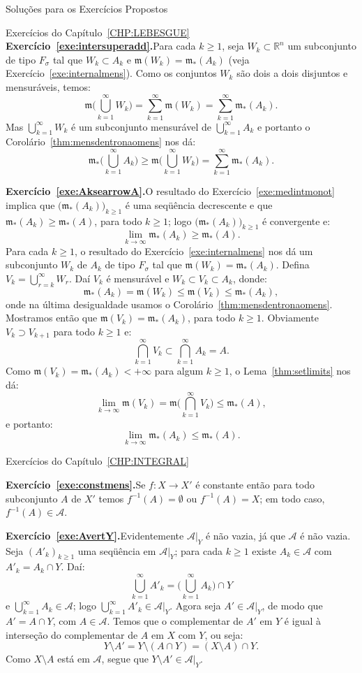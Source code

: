 \documentclass[oneside,final,11pt]{amsbook}
\newcommand{\R}{\mathds R}
\newcommand{\leb}{\mathfrak m}
\theoremstyle{remark}\newtheorem{exercise}{Exercício}[chapter]
\theoremstyle{remark}\newtheorem{*exercise}[exercise]{\hbox to 0pt{\hskip 0pt minus 1fil*}Exercício}
\theoremstyle{definition}\newtheorem{exdefin}{Definição}[chapter]
\theoremstyle{plain}\newtheorem{teo}{Teorema}[section]
\theoremstyle{plain}\newtheorem{lem}[teo]{Lema}
\theoremstyle{plain}\newtheorem{prop}[teo]{Proposição}
\theoremstyle{plain}\newtheorem{cor}[teo]{Corolário}
\theoremstyle{definition}\newtheorem{defin}[teo]{Definição}
\theoremstyle{remark}\newtheorem{rem}[teo]{Observação}
\theoremstyle{definition}\newtheorem{notation}[teo]{Notação}
\theoremstyle{definition}\newtheorem{convention}[teo]{Convenção}
\theoremstyle{definition}\newtheorem{example}[teo]{Exemplo}
\numberwithin{section}{chapter}
\numberwithin{equation}{section}
\begin{document}
\begin{chapter}{Soluções para os Exercícios Propostos}
\begin{section}{Exercícios do Capítulo~\ref{CHP:LEBESGUE}}
\textbf{Exercício~\ref{exe:intersuperadd}.}\enspace Para cada $k\ge1$, seja $W_k\subset\R^n$ um subconjunto
de tipo $F_\sigma$ tal que $W_k\subset A_k$ e $\leb(W_k)=\leb_*(A_k)$ (veja Exercício~\ref{exe:internalmens}).
Como os conjuntos $W_k$ são dois a dois disjuntos e mensuráveis, temos:
\[\leb\Big(\bigcup_{k=1}^\infty W_k\Big)=\sum_{k=1}^\infty\leb(W_k)=\sum_{k=1}^\infty\leb_*(A_k).\]
Mas $\bigcup_{k=1}^\infty W_k$ é um subconjunto mensurável de $\bigcup_{k=1}^\infty A_k$ e portanto
o Corolário~\ref{thm:mensdentronaomens} nos dá:
\[\leb_*\Big(\bigcup_{k=1}^\infty A_k\Big)\ge\leb\Big(\bigcup_{k=1}^\infty W_k\Big)=\sum_{k=1}^\infty\leb_*(A_k).\]

\medskip

\textbf{Exercício~\ref{exe:AksearrowA}.}\enspace O resultado do Exercício~\ref{exe:medintmonot}
implica que $\big(\leb_*(A_k)\big)_{k\ge1}$ é uma seqüência decrescente e que
$\leb_*(A_k)\ge\leb_*(A)$, para todo $k\ge1$; logo $\big(\leb_*(A_k)\big)_{k\ge1}$
é convergente e:
\[\lim_{k\to\infty}\leb_*(A_k)\ge\leb_*(A).\]
Para cada $k\ge1$, o resultado do Exercício~\ref{exe:internalmens}
nos dá um subconjunto $W_k$ de $A_k$ de tipo $F_\sigma$ tal que $\leb(W_k)=\leb_*(A_k)$.
Defina $V_k=\bigcup_{r=k}^\infty W_r$. Daí $V_k$ é mensurável e $W_k\subset V_k\subset A_k$,
donde:
\[\leb_*(A_k)=\leb(W_k)\le\leb(V_k)\le\leb_*(A_k),\]
onde na última desigualdade usamos o Corolário~\ref{thm:mensdentronaomens}. Mostramos então que $\leb(V_k)=\leb_*(A_k)$,
para todo $k\ge1$. Obviamente $V_k\supset V_{k+1}$ para todo $k\ge1$ e:
\[\bigcap_{k=1}^\infty V_k\subset\bigcap_{k=1}^\infty A_k=A.\]
Como $\leb(V_k)=\leb_*(A_k)<+\infty$ para algum $k\ge1$, o Lema~\ref{thm:setlimits}
nos dá:
\[\lim_{k\to\infty}\leb(V_k)=\leb\Big(\bigcap_{k=1}^\infty V_k\Big)\le\leb_*(A),\]
e portanto:
\[\lim_{k\to\infty}\leb_*(A_k)\le\leb_*(A).\]

\end{section}

\begin{section}{Exercícios do Capítulo~\ref{CHP:INTEGRAL}}

\textbf{Exercício~\ref{exe:constmens}.}\enspace Se $f:X\to X'$ é constante então para todo subconjunto
$A$ de $X'$ temos $f^{-1}(A)=\emptyset$ ou $f^{-1}(A)=X$; em todo caso, $f^{-1}(A)\in\mathcal A$.

\medskip

\textbf{Exercício~\ref{exe:AvertY}.}\enspace Evidentemente $\mathcal A\vert_Y$ é não
vazia, já que $\mathcal A$ é não vazia. Seja $(A'_k)_{k\ge1}$ uma seqüência em $\mathcal A\vert_Y$;
para cada $k\ge1$ existe $A_k\in\mathcal A$ com $A'_k=A_k\cap Y$. Daí:
\[\bigcup_{k=1}^\infty A'_k=\Big(\bigcup_{k=1}^\infty A_k\Big)\cap Y\]
e $\bigcup_{k=1}^\infty A_k\in\mathcal A$; logo $\bigcup_{k=1}^\infty A'_k\in\mathcal A\vert_Y$.
Agora seja $A'\in\mathcal A\vert_Y$, de modo que $A'=A\cap Y$, com $A\in\mathcal A$.
Temos que o complementar de $A'$ em $Y$ é igual à interseção do complementar de $A$
em $X$ com $Y$, ou seja:
\[Y\setminus A'=Y\setminus(A\cap Y)=(X\setminus A)\cap Y.\]
Como $X\setminus A$ está em $\mathcal A$, segue que $Y\setminus A'\in\mathcal A\vert_Y$.


\end{section}
\end{chapter}
\end{document}
